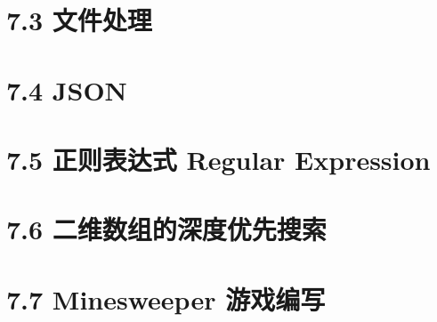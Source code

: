\documentclass[12pt]{article}
\begin{document}
    \section*{7.3 文件处理}
    \section*{7.4 JSON}
    \section*{7.5 正则表达式 Regular Expression}
    \section*{7.6 二维数组的深度优先搜索}
    \section*{7.7 Minesweeper 游戏编写}


        
\end{document}
